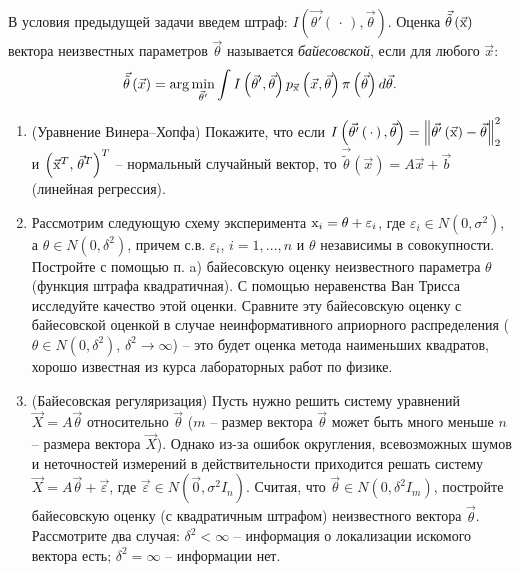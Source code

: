 \begin{problem} 
В условия предыдущей задачи введем штраф: $I(\vec{\theta'}\left(\, \cdot \, \right),\vec{\theta })$. Оценка $\vec{\tilde{\theta }}\left(\vec{{\rm x}}\right)$ вектора неизвестных параметров $\vec{\theta }$ называется \textit{байесовской}, если для любого $\vec{x}$:
\[\vec{\tilde{\theta }}\left(\vec{x}\right)=\arg \mathop{\min }\limits_{\vec{\theta }'} \int I\left(\vec{\theta }',\vec{\theta }\right) p_{\vec{{\rm x}}} \left(\vec{x},\vec{\theta }\right)\pi \left(\vec{\theta }\right)d\vec{\theta }.\] 

\begin{enumerate}
\item(Уравнение Винера--Хопфа) Покажите, что если 
$I\left(\vec{\theta'}\left(\, \cdot \, \right),\vec{\theta }\right)=\left\| \vec{\theta'}\left(\vec{{\rm x}}\right)-\vec{\theta }\right\| _{2}^{2} $ и $\left(\vec{{\rm x}}^T{\rm ,}\; \vec{\theta }^T\right)^T$ -- нормальный случайный вектор, то $\vec{\tilde{\theta }}\left(\vec{x}\right)=A\vec{x}+\vec{b}$ (линейная регрессия).

\item Рассмотрим следующую схему эксперимента ${\rm x}_{i} =\theta +\varepsilon _{i} $, где $\varepsilon _{i} \in N\left(0,\sigma ^{2} \right)$, а $\theta \in N\left(0,\delta ^{2} \right)$, причем с.в. $\varepsilon _{i} $, $i=1,...,n$ и $\theta $ независимы в совокупности. Постройте с помощью п. a) байесовскую оценку неизвестного параметра $\theta $ (функция штрафа квадратичная). С помощью неравенства Ван Трисса исследуйте качество этой оценки. Сравните эту байесовскую оценку с байесовской оценкой в случае неинформативного априорного распределения ($\theta \in N\left(0,\delta ^{2} \right)$, $\delta ^{2} \to \infty $) -- это будет оценка метода наименьших квадратов, хорошо известная из курса  лабораторных работ по физике.

\item (Байесовская регуляризация) Пусть нужно решить систему уравнений $\vec{X}=A\vec{\theta }$ относительно $\vec{\theta }$ ($m$ -- размер вектора $\vec{\theta }$ может быть много меньше $n$ -- размера вектора $\vec{X}$). Однако из-за ошибок округления, всевозможных шумов и неточностей измерений в действительности приходится решать систему $\vec{X}=A\vec{\theta }+\vec{\varepsilon }$, где $\vec{\varepsilon }\in N\left(\vec{0},\sigma ^{2} I_{n} \right)$. Считая, что $\vec{\theta }\in N\left(0,\delta ^{2} I_{m} \right)$, постройте байесовскую оценку (с квадратичным штрафом) неизвестного вектора $\vec{\theta }$. Рассмотрите два случая: $\delta ^{2} <\infty $ -- информация о локализации искомого вектора есть; $\delta ^{2} =\infty $ -- информации нет.

\end{enumerate}

\end{problem}

